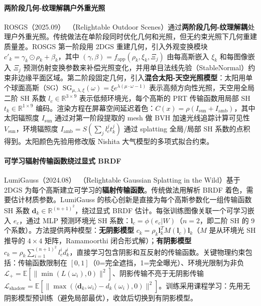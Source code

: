 \paragraph{两阶段几何-纹理解耦户外重光照}

ROSGS（2025.09）~\cite{2509_11275}（Relightable Outdoor Scenes）通过\textbf{两阶段几何-纹理解耦}处理户外重光照。传统做法在单阶段同时优化几何和光照，但无约束光照下几何重建质量差。ROSGS 第一阶段用 2DGS 重建几何，引入外观变换模块 $c'_k = \gamma_k \odot \rho_k + \beta_k$，其中 $(\gamma, \beta) = f_{\text{app}}(\rho_k, \xi_k, \Xi_j)$ 由每高斯嵌入 $\xi_k$ 和每图像嵌入 $\Xi_j$ 预测仿射变换参数来补偿光照变化，并用单目法线先验（StableNormal）约束非边缘平面区域。第二阶段固定几何，引入\textbf{混合太阳-天空光照模型}：太阳用单个球面高斯（SG）$\text{SG}_{\mu,\lambda,\xi}(\omega) = \xi e^{\lambda(\mu \cdot \omega - 1)}$ 表示高频方向性光照，天空用全局二阶 SH 系数 $l_c \in \mathbb{R}^{3 \times 9}$ 表示低频环境光，每个高斯的 PRT 传输函数用局部 SH $t_k \in \mathbb{R}^{1 \times 9}$ 编码。渲染方程在屏幕空间延迟着色：$C(x) = \rho (I_{\text{sun}} + I_{\text{amb}})$，其中太阳辐照度 $I_{\text{sun}}$ 通过对第一阶段提取的 mesh 做 BVH 加速光线追踪计算可见性 $V_{\text{sun}}$，环境辐照度 $I_{\text{amb}} = S(\sum_j l_c^j t_k^j)$ 通过 splatting 全局/局部 SH 系数的点积得到。太阳颜色先验用修改版 Nishita 大气模型的多项式拟合约束。

\paragraph{可学习辐射传输函数绕过显式 BRDF}

LumiGauss（2024.08）~\cite{2408_04474}（Relightable Gaussian Splatting in the Wild）基于 2DGS 为每个高斯建立可学习的\textbf{辐射传输函数}。传统做法用解析 BRDF 着色，需要估计材质参数。LumiGauss 的核心创新是直接为每个高斯参数化一组传输函数 SH 系数 $\mathbf{d}_k \in \mathbb{R}^{(n+1)^2}$，绕过显式 BRDF 估计。每张训练图像关联一个可学习嵌入 $e_c$，通过 MLP 预测环境光 SH 系数：$\mathbf{l}_c = \phi(e_c | W)$（$n=2$，即二阶 SH 的 9 个系数）。方法提供两种模型：\textbf{无阴影模型} $c_k = \rho_k \mathbf{l}_k^T M(\mathbf{l}_c) \mathbf{l}_k$（$M$ 是从环境光 SH 推导的 $4 \times 4$ 矩阵，Ramamoorthi 闭合形式解）；\textbf{有阴影模型} $c_k = \rho_k \sum_{i=1}^{(n+1)^2} l_c^i d_k^i$，直接学习包含阴影和互反射的传输函数。关键物理约束包括：传输函数限制在 $[0,1]$（0=完全遮挡，1=完全曝光）、环境光限制为非负 $\mathcal{L}_+ = \mathbb{E}[\|\min(L(\omega_i), 0)\|^2]$、阴影传输不亮于无阴影传输 $\mathcal{L}_{\text{shadow}} = \mathbb{E}[\|\max(\langle\mathbf{d}_k, \omega_i \rangle - d_k(\omega_i), 0)\|^2]$。训练采用课程学习：先用无阴影模型预训练（避免局部最优），收敛后切换到有阴影模型。

